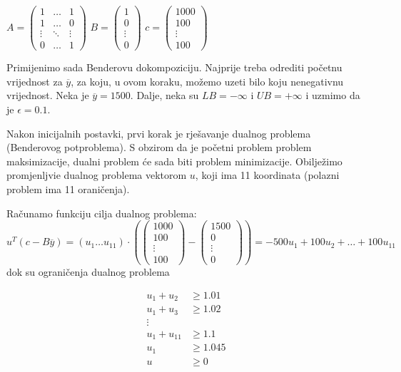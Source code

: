\documentclass[a4paper, utf8, 11pt, colorlinks]{book}
\begin{document}
$A=\left(
\begin{array}{ccc}
	1 & \ldots & 1 \\
	1 & \ldots & 0 \\
	\vdots & \ddots & \vdots \\
	0 & \ldots & 1
\end{array}\right)$
$B=\left(\begin{array}{c}
	1 \\
	0 \\
	\vdots \\
	0
\end{array}\right)$ 
$c=\left(\begin{array}{c}
	1000 \\
	100 \\
	\vdots \\
	100
\end{array}\right)$ 


Primijenimo sada Benderovu dokompoziciju. Najprije treba odrediti početnu vrijednost za $\overline{y}$, za koju, u ovom koraku, možemo uzeti bilo koju nenegativnu vrijednost. Neka je $\overline{y}=1500$. Dalje, neka su $LB=-\infty$ i $UB=+\infty$ i uzmimo da je $\epsilon = 0.1$.

 Nakon inicijalnih postavki, prvi korak je rješavanje dualnog problema (Benderovog potproblema). S obzirom da je početni problem problem maksimizacije, dualni problem će sada biti problem minimizacije. Obilježimo promjenljvie dualnog problema vektorom  $u$, koji ima 11 koordinata (polazni problem ima 11 oraničenja).
 
 Računamo funkciju cilja dualnog problema:
 $$
u^T (c-B\overline{y})=(u_1\ldots u_{11})\cdot \left(\left(\begin{array}{c}
	1000 \\
	100 \\
	\vdots \\
	100
\end{array}\right)-\left(\begin{array}{c}
1500 \\
0 \\
\vdots \\
0
\end{array}\right)\right) = -500u_1+100u_2+\ldots+100u_{11}
$$
dok su ograničenja dualnog problema

$$
\begin{aligned}
	u_1+u_2&\geqslant 1.01\\
	u_1+u_3&\geqslant 1.02\\
	\vdots&\\
	u_1+u_{11}&\geqslant 1.1\\
	u_1&\geqslant 1.045\\ 
	u&\geqslant 0\\
\end{aligned}
$$
\end{document}
